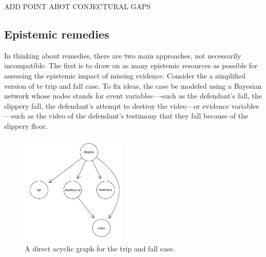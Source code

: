 \documentclass[
  10pt,
  dvipsnames,enabledeprecatedfontcommands]{scrartcl}
\begin{document}
ADD POINT ABOT CONJECTURAL GAPS

\hypertarget{epistemic-remedies}{%
\subsection{Epistemic remedies}\label{epistemic-remedies}}

In thinking about remedies, there are two main approaches, not
necessarily incompatible. The first is to draw on as many epistemic
resources as possible for assessing the epistemic impact of missing
evidence. Consider the a simplified version of te trip and fall case. To
fix ideas, the case be modeled using a Bayesian network whose nodes
stands for event variables----such as the defendant's fall, the slippery
fall, the defendant's attempt to destroy the video---or evidence
variables---such as the video of the defendant's testimony that they
fall because of the slippery floor.

\begin{figure}
\includegraphics[width=5cm]{slippery-dag.png}
\caption{A direct acyclic graph for the trip and fall case.}
\label{fig:dag-missing-video}
\end{figure}
\end{document}
